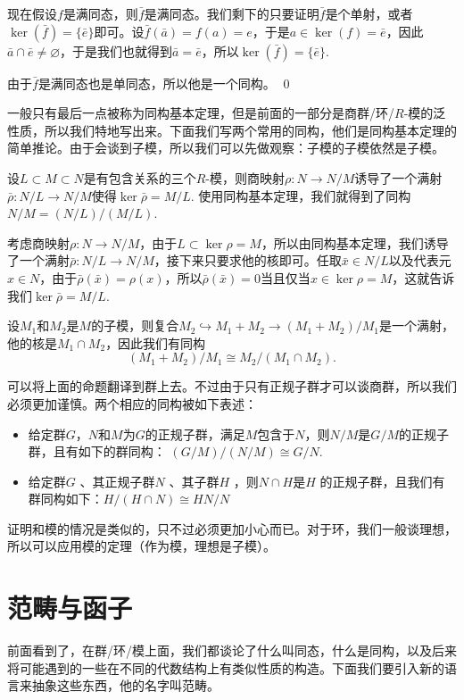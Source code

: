 	现在假设$f$是满同态，则$\bar{f}$是满同态。我们剩下的只要证明$\bar{f}$是个单射，或者$\ker(\bar{f})=\{\bar{e}\}$即可。设$\bar{f}(\bar{a})=f(a)=e$，于是$a\in \ker(f)=\bar{e}$，因此$\bar{a}\cap \bar{e}\neq\varnothing$，于是我们也就得到$\bar{a}=\bar{e}$，所以$\ker(\bar{f})=\{\bar{e}\}$. 

	由于$\bar{f}$是满同态也是单同态，所以他是一个同构。
\qed

一般只有最后一点被称为同构基本定理，但是前面的一部分是商群/环/$R$-模的泛性质，所以我们特地写出来。下面我们写两个常用的同构，他们是同构基本定理的简单推论。由于会谈到子模，所以我们可以先做观察：子模的子模依然是子模。

\para 设$L\subset M \subset N$是有包含关系的三个$R$-模，则商映射$\rho:N\to N/M$诱导了一个满射$\bar{\rho}:N/L \to N/M$使得$\ker \bar{\rho}=M/L$. 使用同构基本定理，我们就得到了同构$N/M=(N/L)/(M/L)$.

考虑商映射$\rho:N\to N/M$，由于$L\subset \ker \rho=M$，所以由同构基本定理，我们诱导了一个满射$\bar{\rho}:N/L \to N/M$，接下来只要求他的核即可。任取$\bar{x}\in N/L$以及代表元$x\in N$，由于$\bar{\rho}(\bar{x})=\rho(x)$，所以$\bar{\rho} (\bar{x})=0$当且仅当$x\in \ker \rho =M$，这就告诉我们$\ker \bar{\rho}=M/L$.

\para 设$M_1$和$M_2$是$M$的子模，则复合$M_2\hookrightarrow M_1+M_2 \to (M_1+M_2)/M_1$是一个满射，他的核是$M_1\cap M_2$，因此我们有同构
\[
	(M_1+M_2)/M_1\cong M_2/(M_1\cap M_2).
\]

\para 可以将上面的命题翻译到群上去。不过由于只有正规子群才可以谈商群，所以我们必须更加谨慎。两个相应的同构被如下表述：

\begin{itemize}
\item 给定群$G$，$N$和$M$为$G$的正规子群，满足$M$包含于$N$，则$N/M$是$G/M$的正规子群，且有如下的群同构： $ (G/M)/(N/M)\cong G/N$.

\item 给定群$G$ 、其正规子群$N$ 、其子群$H$ ，则$N\cap H$是$H$ 的正规子群，且我们有群同构如下：$H/(H\cap N)\cong HN/N$
\end{itemize}

证明和模的情况是类似的，只不过必须更加小心而已。对于环，我们一般谈理想，所以可以应用模的定理（作为模，理想是子模）。

\section{范畴与函子}

前面看到了，在群/环/模上面，我们都谈论了什么叫同态，什么是同构，以及后来将可能遇到的一些在不同的代数结构上有类似性质的构造。下面我们要引入新的语言来抽象这些东西，他的名字叫范畴。

